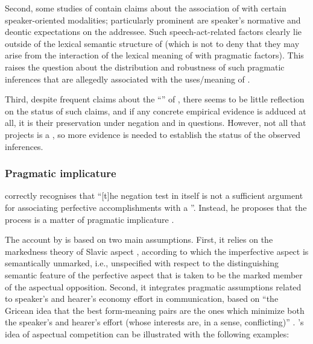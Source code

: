  Second, some studies of  \citep[here represented by][]{Paducheva:96, Romanova:06} contain claims about the association of  with certain speaker-oriented modalities; particularly prominent are speaker's normative and deontic expectations on the addressee. Such speech-act-related factors clearly lie outside of the lexical semantic structure of  (which is not to deny that they may arise from the interaction of the lexical meaning of  with pragmatic factors). This raises the question about the distribution and robustness of such pragmatic inferences that are allegedly associated with the uses/meaning of . 

 Third, despite frequent claims about the ``'' of , there seems to be little reflection on the status of such claims, and if any concrete empirical evidence is adduced at all, it is their preservation under negation and in questions. However, not all that projects is a  \citep[see, e.g.,][]{ChierchiaMcConnell-Ginet:90, Beaver:01, Potts:05}, so more evidence is needed to establish the status of the observed inferences.

\subsubsection{Pragmatic implicature}
\citet[61]{Gronn:04} correctly recognises that ``[t]he negation test in itself is not a sufficient argument for associating perfective accomplishments with a ''. Instead, he proposes that the process  is a matter of pragmatic implicature \citep{Grice:75}.

The account by \citet{Gronn:04, Gronn:06} is based on two main assumptions. First, it relies on the markedness theory of Slavic aspect \citep{Maslov:58, Jakobson:71}, according to which the imperfective aspect is semantically unmarked, i.e., unspecified with respect to the distinguishing semantic feature of the perfective
aspect that is taken to be the marked member of the aspectual opposition.
Second, it integrates pragmatic assumptions related to speaker's and hearer's economy effort in communication, based on ``the Gricean idea that the best form-meaning pairs are the ones which minimize both the speaker's and hearer's effort (whose interests are, in a sense, conflicting)'' \citep[][71]{Gronn:06}. \citeauthor{Gronn:06}'s idea of aspectual competition can be illustrated with the following examples:


